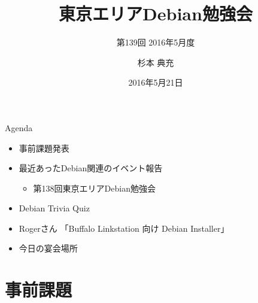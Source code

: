 \title{東京エリアDebian勉強会}
\subtitle{第139回 2016年5月度}
\author{杉本 典充}
\date{2016年5月21日}



\begin{frame}
\titlepage{}
\end{frame}

\begin{frame}{Agenda}
 \begin{minipage}[t]{0.45\hsize}
  \begin{itemize}
   \item 事前課題発表
   \item 最近あったDebian関連のイベント報告
	 \begin{itemize}
	 \item 第138回東京エリアDebian勉強会
	 \end{itemize}
  \end{itemize}
 \end{minipage} 
 \begin{minipage}[t]{0.45\hsize}
  \begin{itemize}
   \item Debian Trivia Quiz
   \item Rogerさん 「Buffalo Linkstation 向け Debian Installer」
   \item 今日の宴会場所
  \end{itemize}
 \end{minipage}
\end{frame}

\section{事前課題}
{\footnotesize
 
}


